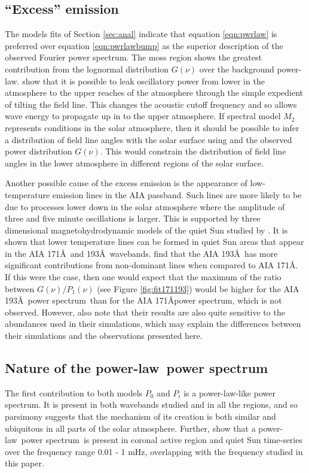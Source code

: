 \documentclass{aastex}
\newcommand{\PS}{power spectrum}
\newcommand{\PL}{power-law}
\begin{document}
\subsection{``Excess'' emission}\label{ssec:excess}
The models fits of Section \ref{sec:anal} indicate that equation
\ref{eqn:pwrlaw} is preferred over equation \ref{eqn:pwrlawbump} as
the superior description of the observed Fourier \PS. The
moss region shows the greatest contribution from the lognormal
distribution $G(\nu)$ over the background \PL.
\cite{2005ApJ...624L..61D} show that it is possible to leak
oscillatory power from lower in the atmosphere to the upper reaches of
the atmosphere through the simple expedient of tilting the field line.
This changes the acoustic cutoff frequency and so allows wave energy
to propagate up in to the upper atmosphere.  If spectral model $M_{2}$
represents conditions in the solar atmosphere, then it should be
possible to infer a distribution of field line angles with the solar
surface using \cite{2005ApJ...624L..61D} and the observed power
distribution $G(\nu)$.  This would constrain the distribution of field
line angles in the lower atmosphere in different regions of the solar
surface.

Another possible cause of the excess emission is the appearance of
low-temperature emission lines in the AIA passband.  Such lines are
more likely to be due to processes lower down in the solar atmosphere
where the amplitude of three and five minute oscillations is larger.
This is supported by three dimensional magnetohydrodynamic models of
the quiet Sun studied by \cite{2011ApJ...743...23M}.  It is shown that
lower temperature lines can be formed in quiet Sun areas that appear
in the AIA 171\AA\ and 193\AA\ wavebands. \cite{2011ApJ...743...23M}
find that the AIA 193\AA\ has more significant contributions from
non-dominant lines when compared to AIA 171\AA.  If this were the
case, then one would expect that the maximum of the ratio between
$G(\nu)/P_{1}(\nu)$ (see Figure \ref{fig:fit171193}) would be higher
for the AIA 193\AA\ \PS\ than for the AIA 171\AA \PS, which is not
observed.  However, \cite{2011ApJ...743...23M} also note that their
results are also quite sensitive to the abundances used in their
simulations, which may explain the differences between their
simulations and the observations presented here.

\subsection{Nature of the \protect\PL\ \protect\PS}\label{ssec:nplps}
The first contribution to both models $P_{0}$ and $P_{i}$ is a
\PL-like \PS.  It is present in both wavebands studied and in all the
regions, and so parsimony suggests that the mechanism of its creation
is both similar and ubiquitous in all parts of the solar atmosphere.
Further, \cite{2014AA...563A...8A} show that a \PL\ \PS\ is present in
coronal active region and quiet Sun time-series over the frequency
range 0.01 - 1 mHz, overlapping with the frequency studied in this paper.
\end{document}
